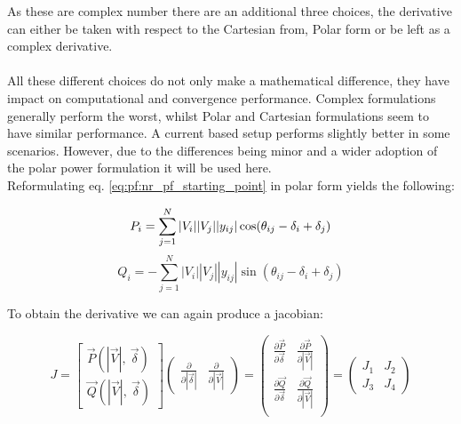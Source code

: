 As these are complex number there are an additional three choices, the derivative can either be taken
with respect to the Cartesian from, Polar form or be left as a complex derivative.\\
\\
All these different choices do not only make a mathematical difference, they have impact
on computational and convergence performance\autocite{newton_raphson_setup_choices}. Complex formulations
generally perform the worst, whilst Polar and Cartesian formulations seem to have similar performance.
A current based setup performs slightly better in some scenarios\autocite{newton_raphson_setup_choices}.
However, due to the differences being minor and a wider adoption of the polar power formulation it will be used
here.\\

Reformulating eq. \ref{eq:pf:nr_pf_starting_point} in polar form yields the following:

\begin{equation}
    P_i = \sum_{j=1}^N |V_i||V_j||y_{ij}| \cos(\theta_{ij} - \delta_i + \delta_j)\\
    \label{eq:pf:nr_pf_p}
\end{equation}
\begin{equation}
    Q_i = -\sum_{j=1}^N |V_i||V_j||y_{ij}| \sin(\theta_{ij} - \delta_i + \delta_j)
    \label{eq:pf:nr_pf_q}
\end{equation}

To obtain the derivative we can again produce a jacobian:

\begin{equation}
    J =  
    \begin{bmatrix}
        \vec{P}(|\vec{V}|, \ \vec{\delta})\\
        \vec{Q}(|\vec{V}|, \ \vec{\delta})
    \end{bmatrix}
    \begin{pmatrix}
        \frac{\partial}{\partial |\vec{\delta}|} & \frac{\partial}{\partial |\vec{V}|}
    \end{pmatrix}
    =
    \begin{pmatrix}
        \frac{\partial \vec{P}}{\partial \vec{\delta}} & \frac{\partial \vec{P} }{\partial |\vec{V}|}\\
        \frac{\partial \vec{Q}}{\partial \vec{\delta}} & \frac{\partial \vec{Q} }{\partial |\vec{V}|}\\
    \end{pmatrix}
    =
    \begin{pmatrix}
        J_1 & J_2\\
        J_3 & J_4
    \end{pmatrix}
    \label{eq:pf:nr_pf_jacobi}
\end{equation}

